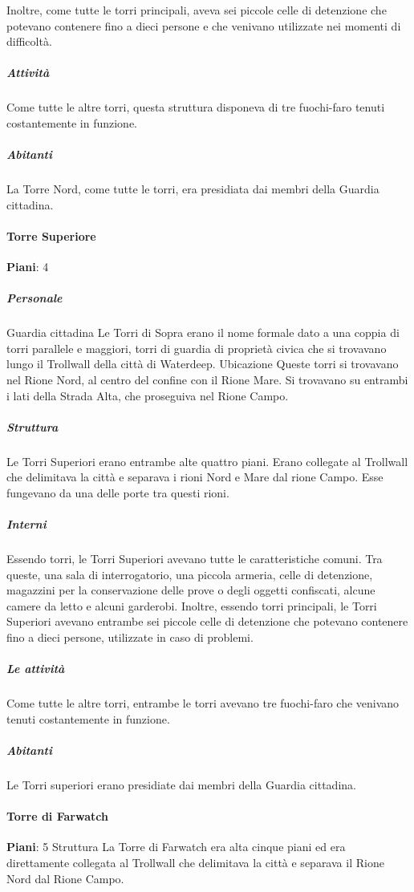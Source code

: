 \documentclass{article}
\begin{document}
Inoltre, come tutte le torri principali, aveva sei piccole celle di detenzione che potevano contenere fino a dieci persone e che venivano utilizzate nei momenti di difficoltà.

\subparagraph{Attività}
Come tutte le altre torri, questa struttura disponeva di tre fuochi-faro tenuti costantemente in funzione.

\subparagraph{Abitanti}
La Torre Nord, come tutte le torri, era presidiata dai membri della Guardia cittadina.


\paragraph{Torre Superiore}
\textbf{Piani}: 4\newline


\subparagraph{Personale}
Guardia cittadina
Le Torri di Sopra erano il nome formale dato a una coppia di torri parallele e maggiori, torri di guardia di proprietà civica che si trovavano lungo il Trollwall della città di Waterdeep.
Ubicazione
Queste torri si trovavano nel Rione Nord, al centro del confine con il Rione Mare. Si trovavano su entrambi i lati della Strada Alta, che proseguiva nel Rione Campo.

\subparagraph{Struttura}
Le Torri Superiori erano entrambe alte quattro piani. Erano collegate al Trollwall che delimitava la città e separava i rioni Nord e Mare dal rione Campo. Esse fungevano da una delle porte tra questi rioni.

\subparagraph{Interni}
Essendo torri, le Torri Superiori avevano tutte le caratteristiche comuni. Tra queste, una sala di interrogatorio, una piccola armeria, celle di detenzione, magazzini per la conservazione delle prove o degli oggetti confiscati, alcune camere da letto e alcuni garderobi. Inoltre, essendo torri principali, le Torri Superiori avevano entrambe sei piccole celle di detenzione che potevano contenere fino a dieci persone, utilizzate in caso di problemi.

\subparagraph{Le attività}
Come tutte le altre torri, entrambe le torri avevano tre fuochi-faro che venivano tenuti costantemente in funzione.

\subparagraph{Abitanti}
Le Torri superiori erano presidiate dai membri della Guardia cittadina.


\paragraph{Torre di Farwatch}
\textbf{Piani}: 5
Struttura
La Torre di Farwatch era alta cinque piani ed era direttamente collegata al Trollwall che delimitava la città e separava il Rione Nord dal Rione Campo.
\end{document}
